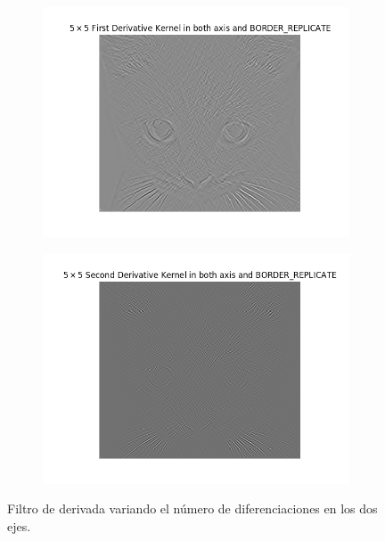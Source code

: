 \documentclass[11pt,a4paper]{article}
\begin{document}
\begin{figure}[H]
\begin{subfigure}{.5\textwidth}
	\centering
	\includegraphics[scale=0.37]{img/der-xy1.png}
	\label{fig:der-xy1}
\end{subfigure}
\begin{subfigure}{.5\textwidth}
	\centering
	\includegraphics[scale=0.37]{img/der-xy2.png}
	\label{fig:der-xy2}
\end{subfigure}
\caption{Filtro de derivada variando el número de diferenciaciones en los dos ejes.}
\label{fig:der-xy}
\end{figure}
\end{document}

